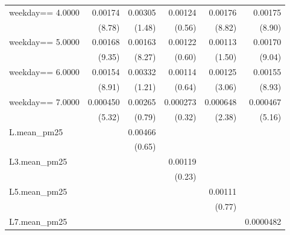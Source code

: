 \begin{table}[htbp]
\begin{tabular}{l*{5}{D{.}{.}{-1}}}
\addlinespace
weekday==     4.0000&     0.00174\sym{***}&     0.00305         &     0.00124         &     0.00176\sym{***}&     0.00175\sym{***}\\
                    &      (8.78)         &      (1.48)         &      (0.56)         &      (8.82)         &      (8.90)         \\
\addlinespace
weekday==     5.0000&     0.00168\sym{***}&     0.00163\sym{***}&     0.00122         &     0.00113         &     0.00170\sym{***}\\
                    &      (9.35)         &      (8.27)         &      (0.60)         &      (1.50)         &      (9.04)         \\
\addlinespace
weekday==     6.0000&     0.00154\sym{***}&     0.00332         &     0.00114         &     0.00125\sym{**} &     0.00155\sym{***}\\
                    &      (8.91)         &      (1.21)         &      (0.64)         &      (3.06)         &      (8.93)         \\
\addlinespace
weekday==     7.0000&    0.000450\sym{***}&     0.00265         &    0.000273         &    0.000648\sym{*}  &    0.000467\sym{***}\\
                    &      (5.32)         &      (0.79)         &      (0.32)         &      (2.38)         &      (5.16)         \\
\addlinespace
L.mean\_pm25         &                     &     0.00466         &                     &                     &                     \\
                    &                     &      (0.65)         &                     &                     &                     \\
\addlinespace
L3.mean\_pm25        &                     &                     &     0.00119         &                     &                     \\
                    &                     &                     &      (0.23)         &                     &                     \\
\addlinespace
L5.mean\_pm25        &                     &                     &                     &     0.00111         &                     \\
                    &                     &                     &                     &      (0.77)         &                     \\
\addlinespace
L7.mean\_pm25        &                     &                     &                     &                     &   0.0000482         \\

\end{tabular}
\end{table}
